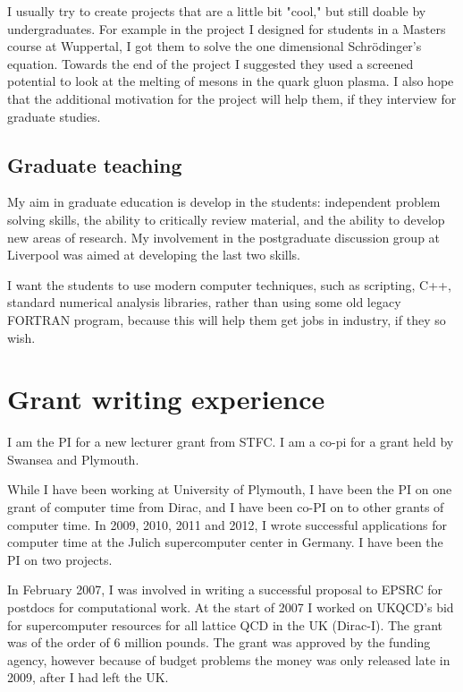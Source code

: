 \documentclass[12pt]{article}
\begin{document}
I usually try to create projects
that are a little bit "cool," but still doable by undergraduates.
For example in the project I designed for students
in a Masters course at Wuppertal, I got them to solve
the one dimensional Schr\"{o}dinger's equation. Towards the end
of the project I suggested they used a screened potential
to look at the melting of mesons in the quark gluon
plasma. I also hope that the additional motivation for the
project will help them,
if they interview for graduate studies.

\subsection{Graduate teaching}

My aim in graduate education is develop in the students:
independent problem solving skills, 
the ability to critically review material, and 
the ability to develop new areas of research. My 
involvement in the postgraduate discussion group at Liverpool
was aimed at developing the last two skills.

I want the students to use modern computer
techniques, such as scripting, C++, standard numerical
analysis libraries, rather than using some old legacy
FORTRAN program, because this will help them 
get jobs in industry, if they so wish.


\section{Grant writing experience} 

I am the PI for  a new lecturer grant from STFC. I am
a co-pi for a grant held by Swansea and Plymouth.

While I have been working  at University of Plymouth, I have been
the PI on one grant of computer time from Dirac, and I have been
co-PI on to other grants of computer time.
In 2009, 2010, 2011
and 2012,
I wrote successful applications for computer time at the Julich
supercomputer center in Germany. I have been the PI on two projects.

In February 2007, I was involved in writing a successful proposal to
EPSRC for postdocs for computational work.  At the start of 2007 I
worked on UKQCD's bid for supercomputer resources for all lattice QCD
in the UK (Dirac-I). The grant was of the order of 6 million
pounds. The grant was approved by the funding agency, however because
of budget problems the money was only released late in 2009, after I
had left the UK.
\end{document}
